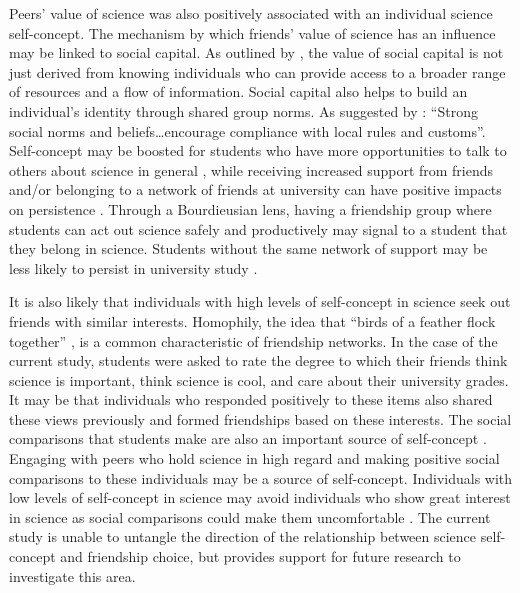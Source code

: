 Peers' value of science was also positively associated with an individual science self-concept. The mechanism by which friends' value of science has an influence may be linked to social capital. As outlined by \cite{lin1999building}, the value of social capital is not just derived from knowing individuals who can provide access to a broader range of resources and a flow of information. Social capital also helps to build an individual's identity through shared group norms. As suggested by \citet[p.29]{Adler2017}: ``Strong social norms and beliefs\ldots encourage compliance with local rules and customs''. Self-concept may be boosted for students who have more opportunities to talk to others about science in general \citep{Archer2015a}, while receiving increased support from friends \citep{bissell2009role} and/or belonging to a network of friends at university can have positive impacts on persistence \citep{thomas2000ties}. Through a Bourdieusian lens, having a friendship group where students can act out science safely and productively may signal to a student that they belong in science. Students without the same network of support may be less likely to persist in university study \citep{thomas2000ties}. 

It is also likely that individuals with high levels of self-concept in science seek out friends with similar interests. Homophily, the idea that ``birds of a feather flock together'' \citep{mcpherson2001birds}, is a common characteristic of friendship networks. In the case of the current study, students were asked to rate the degree to which their friends think science is important, think science is cool, and care about their university grades. It may be that individuals who responded positively to these items also shared these views previously and formed friendships based on these interests. The social comparisons that students make are also an important source of self-concept \citep{butz2015salient}. Engaging with peers who hold science in high regard and making positive social comparisons to these individuals may be a source of self-concept. Individuals with low levels of self-concept in science may avoid individuals who show great interest in science as social comparisons could make them uncomfortable \citep{bong1999comparison}. The current study is unable to untangle the direction of the relationship between science self-concept and friendship choice, but provides support for future research to investigate this area.   

